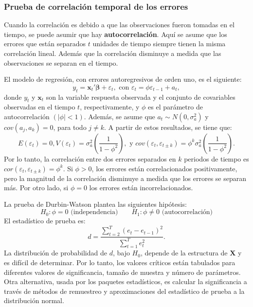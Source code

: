 \documentclass[
]{article}
\begin{document}
\hypertarget{prueba-de-correlaciuxf3n-temporal-de-los-errores}{%
\subsubsection{Prueba de correlación temporal de los errores}\label{prueba-de-correlaciuxf3n-temporal-de-los-errores}}

Cuando la correlación es debido a que las observaciones fueron tomadas en el tiempo, se puede asumir que hay \textbf{autocorrelación}. Aquí se asume que los errores que están separados \(t\) unidades de tiempo siempre tienen la misma correlación lineal. Además que la correlación disminuye a medida que las observaciones se separan en el tiempo.

El modelo de regresión, con errores autoregresivos de orden uno, es el siguiente:
\[
y_{t} = \boldsymbol x_{t}'\boldsymbol \beta+ \varepsilon_{t}, \mbox{ con }\varepsilon_{t}= \phi\varepsilon_{t-1} + a_{t},
\]
donde \(y_{t}\) y \(\boldsymbol x_{t}\) son la variable respuesta observada y el conjunto de covariables observadas en el tiempo \(t\), respectivamente, y \(\phi\) es el parámetro de autocorrelación \((|\phi| < 1)\). Además, se asume que \(a_{t} \sim N(0,\sigma^{2}_{a})\) y \(cov(a_{j},a_{k})=0\), para todo \(j \neq k\). A partir de estos resultados, se tiene que:
\[
E(\varepsilon_{t}) = 0, V(\varepsilon_{t}) = \sigma^{2}_{a}\left( \frac{1}{1-\phi^2}\right), \mbox{ y } cov(\varepsilon_{t},\varepsilon_{t \pm k})= \phi^{k}\sigma^{2}_{a}\left( \frac{1}{1-\phi^2} \right).
\]
Por lo tanto, la correlación entre dos errores separados en \(k\) periodos de tiempo es \(cor(\varepsilon_{t},\varepsilon_{t\pm k}) = \phi^{k}\). Si \(\phi > 0\), los errores están correlacionados positivamente, pero la magnitud de la correlación disminuye a medida que los errores se separan más. Por otro lado, si \(\phi =0\) los errores están incorrelacionados.

La prueba de Durbin-Watson plantea las siguientes hipótesis:
\[
H_{0}: \phi = 0 \mbox{ (independencia)} \qquad H_{1}:\phi \neq 0  \mbox{ (autocorrelación)}
\]
El estadístico de prueba es:
\[
d = \frac{\sum_{t=2}^{T}\left( e_{t} - e_{t-1}\right)^{2}}{\sum_{t=1}^{T}e_{t}^{2}}.
\]
La distribución de probabilidad de \(d\), bajo \(H_{0}\), depende de la estructura de \(\boldsymbol X\) y es difícil de determinar. Por lo tanto, los valores críticos están tabulados para diferentes valores de significancia, tamaño de muestra y número de parámetros. Otra alternativa, usada por los paquetes estadísticos, es calcular la significancia a través de métodos de remuestreo y aproximaciones del estadístico de prueba a la distribución normal.
\end{document}
